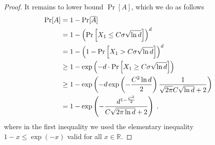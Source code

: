 \documentclass{article}
\newcommand{\field}[1]{\mathbb{#1}}
\newcommand{\R}{\field{R}}
\begin{document}
\begin{proof}
It remains to lower bound $\Pr[A]$, which we do as follows
\begin{align}
\Pr[A]
& = 1 - \Pr[\overline{A}] \notag \\
& = 1 - \left( \Pr \left[ X_1 \le C \sigma \sqrt{\ln d} \right] \right)^d  \notag \\
& = 1 - \left(1 - \Pr\left[ X_1 > C \sigma \sqrt{\ln d} \right] \right)^d \notag \\
& \ge 1 - \exp\left(-d \cdot \Pr\left[X_1 \ge C \sigma \sqrt{\ln d} \right]\right) \notag \\
& \ge 1 - \exp\left(-d \exp\left(-\frac{C^2 \ln d}{2}\right) \frac{1}{\sqrt{2\pi}C \sqrt{\ln d}+2} \right) \notag \\
& = 1 - \exp\left(-\frac{d^{1-\frac{C^2}{2}}}{C \sqrt{2\pi \ln d}+2}\right) \label{equation:maximum-of-gaussians-lower-bound-4} \; .
\end{align}
where in the first inequality we used the elementary inequality $1 - x \le \exp(-x)$ valid for all $x \in \R$.


\end{proof}
\end{document}
